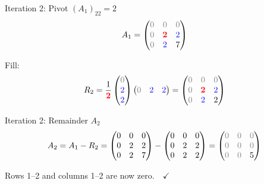 \documentclass[10pt]{beamer}
\theoremstyle{definition}
\newcommand{\pvt}[1]{{\color{red}\mathbf{#1}}}       %
\newcommand{\crs}[1]{{\color{blue}#1}}                %
\newcommand{\rem}[1]{{\color{gray}#1}}                %
\begin{document}
\begin{frame}{Iteration 2: Pivot $(A_1)_{22} = 2$}
$$A_1 = \begin{pmatrix}
\rem{0} & \rem{0} & \rem{0} \\
\rem{0} & \pvt{2} & \crs{2} \\
\rem{0} & \crs{2} & 7
\end{pmatrix}$$

\vfill
Fill:
$$R_2 = \frac{1}{\pvt{2}}
\begin{pmatrix} \rem{0} \\ \crs{2} \\ \crs{2} \end{pmatrix}
\begin{pmatrix} \rem{0} & \crs{2} & \crs{2} \end{pmatrix}
= \begin{pmatrix}
\rem{0} & \rem{0} & \rem{0} \\
\rem{0} & \pvt{2} & \crs{2} \\
\rem{0} & \crs{2} & 2
\end{pmatrix}$$
\end{frame}

\begin{frame}{Iteration 2: Remainder $A_2$}
$$A_2 = A_1 - R_2 = \begin{pmatrix}
0 & 0 & 0 \\
0 & 2 & 2 \\
0 & 2 & 7
\end{pmatrix}
- \begin{pmatrix}
0 & 0 & 0 \\
0 & 2 & 2 \\
0 & 2 & 2
\end{pmatrix}
= \begin{pmatrix}
\rem{0} & \rem{0} & \rem{0} \\
\rem{0} & \rem{0} & \rem{0} \\
\rem{0} & \rem{0} & 5
\end{pmatrix}$$

\vfill
Rows 1--2 and columns 1--2 are now \rem{zero}.\ \ $\checkmark$
\end{frame}
\end{document}
